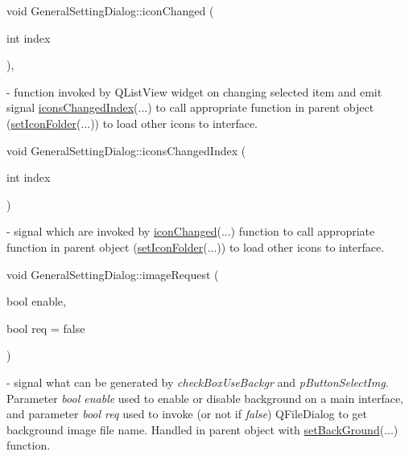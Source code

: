 \mbox{\label{classGeneralSettingDialog_a6907e319fa3cedb66f4645cd0f3ad676}} 
{\footnotesize\ttfamily void General\+Setting\+Dialog\+::\texorpdfstring{icon\+Changed}{iconChanged} (\begin{DoxyParamCaption}\item[{int}]{index }\end{DoxyParamCaption}){\ttfamily [private]}, {\ttfamily [slot]}} - function invoked by Q\+List\+View widget on changing selected item and emit signal \hyperlink{classGeneralSettingDialog_aa0b2ee80957f63f302aa9a6ac6e13f5d}{icons\+Changed\+Index}(...) to call appropriate function in parent object (\hyperlink{classMainWindow_a1c07847e8f3adb976aa52cea3f032d7d}{set\+Icon\+Folder}(...)) to load other icons to interface.

\mbox{\label{classGeneralSettingDialog_aa0b2ee80957f63f302aa9a6ac6e13f5d}} 
{\footnotesize\ttfamily void General\+Setting\+Dialog\+::\texorpdfstring{icons\+Changed\+Index}{iconsChangedIndex} (\begin{DoxyParamCaption}\item[{int}]{index }\end{DoxyParamCaption}){\ttfamily [signal]}} - signal which are invoked by \hyperlink{classGeneralSettingDialog_a6907e319fa3cedb66f4645cd0f3ad676}{icon\+Changed}(...) function to call appropriate function in parent object (\hyperlink{classMainWindow_a1c07847e8f3adb976aa52cea3f032d7d}{set\+Icon\+Folder}(...)) to load other icons to interface.

\mbox{\label{classGeneralSettingDialog_a1c6ff8e8d7b1ad5f4399942ea48dc9d8}} 
{\footnotesize\ttfamily void General\+Setting\+Dialog\+::\texorpdfstring{image\+Request}{imageRequest} (\begin{DoxyParamCaption}\item[{bool}]{enable,  }\item[{bool}]{req = {\ttfamily false} }\end{DoxyParamCaption}){\ttfamily [signal]}} - signal what can be generated by \textit{check\+Box\+Use\+Backgr} and \textit{p\+Button\+Select\+Img}. Parameter \textit{bool enable} used to enable or disable background on a main interface, and parameter \textit{bool req} used to invoke (or not if \textit{false}) Q\+File\+Dialog to get background image file name. Handled in parent object with \hyperlink{classMainWindow_aa08c1cb3f9e678d6af8f79dc2cc486d5}{set\+Back\+Ground}(...) function.

